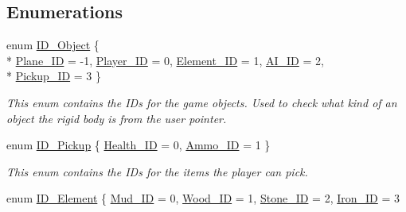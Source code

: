 \subsection*{Enumerations}
\begin{DoxyCompactItemize}
\item 
enum \hyperlink{namespaceoctet_ae14a40f56acaed04355429b24bf458e7}{I\+D\+\_\+\+Object} \{ \\*
\hyperlink{namespaceoctet_ae14a40f56acaed04355429b24bf458e7a491b9ccf81c178214d49a98b2d33b042}{Plane\+\_\+\+I\+D} = -\/1, 
\hyperlink{namespaceoctet_ae14a40f56acaed04355429b24bf458e7a5c20c8692e98f9f94883e6bcc8fd12dc}{Player\+\_\+\+I\+D} = 0, 
\hyperlink{namespaceoctet_ae14a40f56acaed04355429b24bf458e7ab803c5aaf40caa6eaff50efa4aad3506}{Element\+\_\+\+I\+D} = 1, 
\hyperlink{namespaceoctet_ae14a40f56acaed04355429b24bf458e7a3d19bfd0716876c3d201134677de2d94}{A\+I\+\_\+\+I\+D} = 2, 
\\*
\hyperlink{namespaceoctet_ae14a40f56acaed04355429b24bf458e7a58b4b5a7969f17157696f9691a807c16}{Pickup\+\_\+\+I\+D} = 3
 \}
\begin{DoxyCompactList}\small\item\em This enum contains the I\+Ds for the game objects. Used to check what kind of an object the rigid body is from the user pointer. \end{DoxyCompactList}\item 
enum \hyperlink{namespaceoctet_a25293ed69f50158637344e438fa1ae72}{I\+D\+\_\+\+Pickup} \{ \hyperlink{namespaceoctet_a25293ed69f50158637344e438fa1ae72a3d0d227c0fe13d73d160e1b8b1ddb531}{Health\+\_\+\+I\+D} = 0, 
\hyperlink{namespaceoctet_a25293ed69f50158637344e438fa1ae72a0c567823ad645972eb32082eb093f016}{Ammo\+\_\+\+I\+D} = 1
 \}
\begin{DoxyCompactList}\small\item\em This enum contains the I\+Ds for the items the player can pick. \end{DoxyCompactList}\item 
enum \hyperlink{namespaceoctet_a8a658c1664b86192b093101b410d8e22}{I\+D\+\_\+\+Element} \{ \hyperlink{namespaceoctet_a8a658c1664b86192b093101b410d8e22a324ef69f1bb1cbe448bac355a6454f8d}{Mud\+\_\+\+I\+D} = 0, 
\hyperlink{namespaceoctet_a8a658c1664b86192b093101b410d8e22a9df8ab8e26428d27934e8f4006ec4ff0}{Wood\+\_\+\+I\+D} = 1, 
\hyperlink{namespaceoctet_a8a658c1664b86192b093101b410d8e22a7c55c376037f3e0568e5afdd52712e2f}{Stone\+\_\+\+I\+D} = 2, 
\hyperlink{namespaceoctet_a8a658c1664b86192b093101b410d8e22a4199137749094f74e555cde8146bbedf}{Iron\+\_\+\+I\+D} = 3

\end{DoxyCompactItemize}
